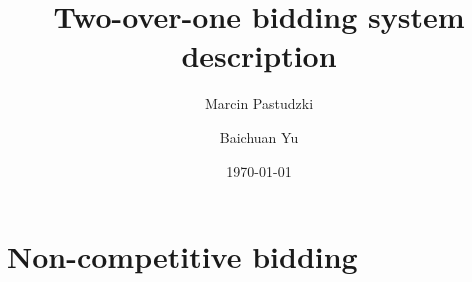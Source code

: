 \documentclass[12pt,a4paper,twoside]{article}
\title{Two-over-one bidding system description}
\author{Marcin Pastudzki \and Baichuan Yu}
\date{\today}
\begin{document}
\maketitle
\tableofcontents
\pagebreak

\section{Non-competitive bidding}



\end{document}
